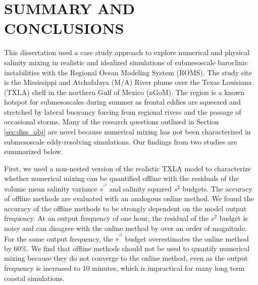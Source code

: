 

\chapter{SUMMARY AND CONCLUSIONS \label{cha:Summary}}
This dissertation used a case study approach to explore numerical and physical salinity mixing in realistic and idealized simulations of submesoscale baroclinic instabilities with the Regional Ocean Modeling System (ROMS). The study site is the Mississippi and Atchafalaya (M/A) River plume over the Texas Louisiana (TXLA) shelf in the northern Gulf of Mexico (nGoM). The region is a known hotspot for submesoscales during summer as frontal eddies are squeezed and stretched by lateral buoyancy forcing from regional rivers and the passage of occasional storms. Many of the research questions outlined in Section \ref{sec:diss_obj} are novel because numerical mixing has not been characterized in submesoscale eddy-resolving simulations. Our findings from two studies are summarized below. 

First, we used a non-nested version of the realistic TXLA model to characterize whether numerical mixing can be quantified offline with the residuals of the volume mean salinity variance $s^{\prime^2}$ and salinity squared $s^2$ budgets. The accuracy of offline methods are evaluated with an analogous online method. We found the accuracy of the offline methods to be strongly dependent on the model output frequency. At an output frequency of one hour, the residual of the $s^2$ budget is noisy and can disagree with the online method by over an order of magnitude. For the same output frequency, the $s^{\prime^2}$ budget overestimates the online method by 60\%. We find that offline methods should not be used to quantify numerical mixing because they do not converge to the online method, even as the output frequency is increased to 10 minutes, which is impractical for many long term coastal simulations. 


